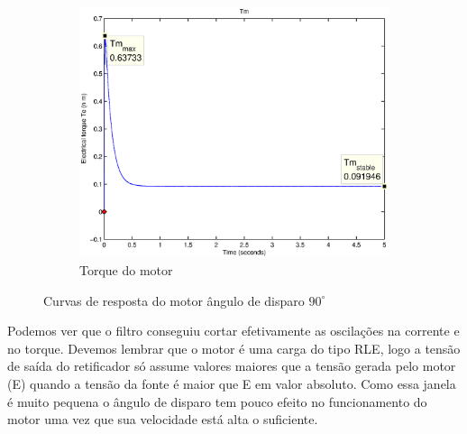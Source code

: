 \documentclass{article}
\begin{document}
\begin{figure}[H]
\begin{subfigure}[b]{0.49\linewidth}
		\includegraphics[width=\linewidth]{matlab/tm7}
		\caption{Torque do motor}
	\end{subfigure}
	\caption{Curvas de resposta do motor ângulo de disparo $90^\circ$}
	\label{fig:res7}
\end{figure}
Podemos ver que o filtro conseguiu cortar efetivamente as oscilações na corrente e no torque. Devemos lembrar que o motor é uma carga do tipo RLE, logo a tensão de saída do retificador só assume valores maiores que a tensão gerada pelo motor (E) quando a tensão da fonte é maior que E em valor absoluto. Como essa janela é muito pequena o ângulo de disparo tem pouco efeito no funcionamento do motor uma vez que sua velocidade está alta o suficiente.
\end{document}
